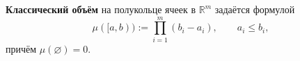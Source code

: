 \label{definition:12}

\begin{definition}
\textbf{Классический объём} на полукольце ячеек в $\mathbb R^m$ задаётся формулой
\[
  \mu([a,b)):=\prod_{i=1}^{m}(b_i-a_i),
  \qquad a_i\le b_i,
\]
причём $\mu(\varnothing)=0$.
\end{definition}
